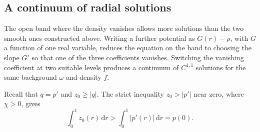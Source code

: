 \subsection{A continuum of radial solutions}
\label{sec:numa-radial-family}

The open band where the density vanishes allows more solutions than the two smooth ones constructed above. Writing a further potential as $G(r)-\rho$, with $G$ a function of one real variable, reduces the equation on the band to choosing the slope $G'$ so that one of the three coefficients vanishes. Switching the vanishing coefficient at two suitable levels produces a continuum of $C^{1,1}$ solutions for the same background $\omega$ and density $f$.

Recall that $q=p'$ and $z_0\geq|q|$. The strict inequality $z_0>|p'|$ near zero, where $\chi>0$, gives
\begin{equation}\label{eq:numa-half-excess}
 \int_0^1z_0(r)\,\mathrm{d}r>\int_0^1|p'(r)|\,\mathrm{d}r=p(0).
\end{equation}

